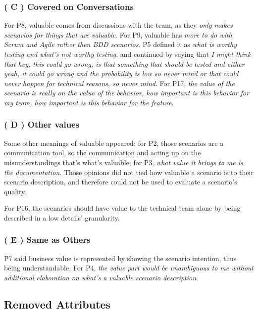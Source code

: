 \subsubsection{\textbf{( C ) Covered on Conversations}}
For P8, valuable comes from discussions with the team, as they \textit{only makes scenarios for things that are valuable}. For P9, valuable has \textit{more to do with Scrum and Agile rather then BDD scenarios}. P5 defined it as \textit{what is worthy testing and what's not worthy testing}, and continued by saying that \textit{I might think that hey, this could go wrong, is that something that should be tested and either yeah, it could go wrong and the probability is low so never mind or that could never happen for technical reasons, so never mind}. For P17, \textit{the value of the scenario is really on the value of the behavior, how important is this behavior for my team, how important is this behavior for the feature}.

\subsubsection{\textbf{( D ) Other values}}
Some other meanings of valuable appeared: for P2, those scenarios are a communication tool, so the communication and acting up on the misunderstandings that's what's valuable; for P3, \textit{what value it brings to me is the documentation}. Those opinions did not tied how valuable a scenario is to their scenario description, and therefore could not be used to evaluate a scenario's quality. 

For P16, the scenarios should have value to the technical team alone by being described in a low details' granularity. 

\subsubsection{\textbf{( E ) Same as Others}}
P7 said business value is represented by showing the scenario intention, thus being understandable. For P4, \textit{the value part would be unambiguous to me without additional elaboration on what's a valuable scenario description}.


\subsection{\label{chap:removed}Removed Attributes}

